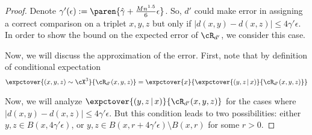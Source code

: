 \begin{proof}
     Denote $\gamma'(\epsilon) := \paren{\hat{\gamma} + \frac{Mn^{1.5}}{6}\epsilon}$. So, $d'$ could make error in assigning a correct comparison on a triplet $x,y,z$ but only if $|d(x,y) - d(x,z)| \le 4\gamma'\epsilon$. In order to show the bound on the expected error of $\cR_{d'}$, we consider this case.
    
    
    Now, we will discuss the approximation of the error. First, note that by definition of conditional expectation
\begin{align*}
    \expctover{(x,y,z) \sim \cX^3}{\cR_{d'}(x,y,z)} = \expctover{x}{\expctover{(y,z\,|\,x)}{\cR_{d'}(x,y,z)}} 
\end{align*}

Now, we will analyze $\expctover{(y,z\,|\,x)}{\cR_{d'}(x,y,z)}$ for the cases where $|d(x,y) - d(x,z)| \le 4\gamma'\epsilon$. But this condition leads to two possibilities: either $y,z \in B(x,4\gamma'\epsilon)$, or $y,z \in B(x,r + 4\gamma'\epsilon)\setminus B(x,r)$ for some $r > 0$.



\end{proof}

